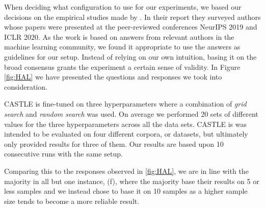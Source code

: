 \documentclass[nofilelist]{cslthse-msc}
\begin{document}
When deciding what configuration to use for our experiments, we based our decisions on the empirical studies made by  \citet{bouthillier:hal-02447823}. In their report they surveyed authors whose papers were presented at the peer-reviewed conferences NeurIPS 2019 and ICLR 2020. As the work is based on answers from relevant authors in the machine learning community, we found it appropriate to use the answers as guidelines for our setup. Instead of relying on our own intuition, basing it on the broad consensus grants the experiment a certain sense of validity. In Figure \ref{fig:HAL} we have presented the questions and responses we took into consideration.

CASTLE is fine-tuned on three hyperparameters where a combination of \textit{grid search} and \textit{random search} was used. On average we performed 20 sets of different values for the three hyperparameters across all the data sets. CASTLE is was intended to be evaluated on four different corpora, or datasets, but ultimately only provided results for three of them. Our results are based upon 10 consecutive runs with the same setup. 

Comparing this to the responses observed in \ref{fig:HAL}, we are in line with the majority in all but one instance, (f), where the majority base their results on 5 or less samples and we instead chose to base it on 10 samples as a higher sample size tends to become a more reliable result.



\end{document}
